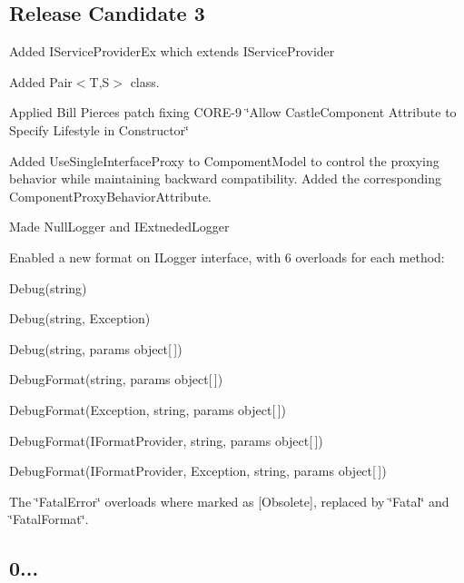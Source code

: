 \subsection*{Release Candidate 3}


\begin{DoxyItemize}
\item Added I\+Service\+Provider\+Ex which extends I\+Service\+Provider
\item Added Pair$<$\+T,\+S$>$ class.
\item Applied Bill Pierce\textquotesingle{}s patch fixing C\+O\+R\+E-\/9 \char`\"{}\+Allow Castle\+Component Attribute to Specify Lifestyle in Constructor\char`\"{}
\item Added Use\+Single\+Interface\+Proxy to Compoment\+Model to control the proxying behavior while maintaining backward compatibility. Added the corresponding Component\+Proxy\+Behavior\+Attribute.
\item Made Null\+Logger and I\+Extneded\+Logger
\item Enabled a new format on I\+Logger interface, with 6 overloads for each method\+:
\begin{DoxyItemize}
\item Debug(string)
\item Debug(string, Exception)
\item Debug(string, params object\mbox{[}$\,$\mbox{]})
\item Debug\+Format(string, params object\mbox{[}$\,$\mbox{]})
\item Debug\+Format(\+Exception, string, params object\mbox{[}$\,$\mbox{]})
\item Debug\+Format(\+I\+Format\+Provider, string, params object\mbox{[}$\,$\mbox{]})
\item Debug\+Format(\+I\+Format\+Provider, Exception, string, params object\mbox{[}$\,$\mbox{]})
\item The \char`\"{}\+Fatal\+Error\char`\"{} overloads where marked as \mbox{[}Obsolete\mbox{]}, replaced by \char`\"{}\+Fatal\char`\"{} and \char`\"{}\+Fatal\+Format\char`\"{}.
\end{DoxyItemize}
\end{DoxyItemize}

\subsection*{0...}


